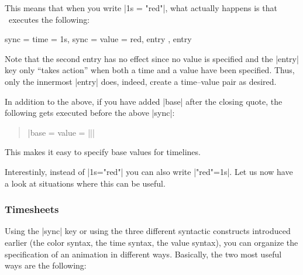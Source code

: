 This means that when you write |1s = "red"|, what actually happens is
that \tikzname\ executes the following:
\begin{codeexample}
sync = { time = 1s, sync = { value = red, entry }, entry }
\end{codeexample}
Note that the second entry has no effect since no value is specified
and the |entry| key only ``takes action'' when both a time and a value
have been specified. Thus, only the innermost |entry| does, indeed,
create a time--value pair as desired.

In addition to the above, if you have added |base| after the closing
quote, the following gets executed before the above |sync|:
\begin{quote}
  \normalfont
  |base = {value = ||}|
\end{quote}

This makes it easy to specify base values for timelines.

Interestinly, instead of |1s="red"| you can also write |"red"=1s|. Let
us now have a look at situations where this can be useful.


\subsubsection{Timesheets}

Using the |sync| key or using the three different syntactic constructs
introduced earlier (the color syntax, the time syntax, the value
syntax), you can organize the specification of an animation in
different ways. Basically, the two most useful ways are the following:

